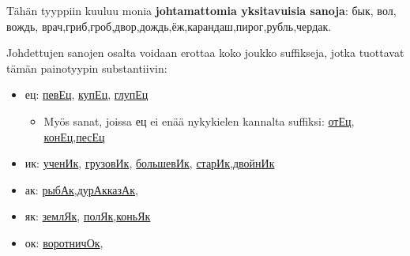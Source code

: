 \documentclass[]{scrreprt}
\providecommand{\tightlist}{%
  \setlength{\itemsep}{0pt}\setlength{\parskip}{0pt}}
\begin{document}
Tähän tyyppiin kuuluu monia \textbf{johtamattomia yksitavuisia sanoja}:
бык, вол, вождь,
врач,гриб,гроб,двор,дождь,ёж,карандаш,пирог,рубль,чердак.

Johdettujen sanojen osalta voidaan erottaa koko joukko suffikseja, jotka
tuottavat tämän painotyypin substantiivin:

\begin{itemize}
\tightlist
\item
  ец:
  \href{http://ru.wiktionary.org/wiki/\%D0\%BF\%D0\%B5\%D0\%B2\%D0\%B5\%D1\%86}{певЕц},
  \href{http://ru.wiktionary.org/wiki/\%D0\%BA\%D1\%83\%D0\%BF\%D0\%B5\%D1\%86}{купЕц},
  \href{http://ru.wiktionary.org/wiki/\%D0\%B3\%D0\%BB\%D1\%83\%D0\%BF\%D0\%B5\%D1\%86}{глупЕц}

  \begin{itemize}
  \tightlist
  \item
    Myös sanat, joissa ец ei enää nykykielen kannalta suffiksi:
    \href{http://ru.wiktionary.org/wiki/\%D0\%BE\%D1\%82\%D0\%B5\%D1\%86}{отЕц},
    \href{http://ru.wiktionary.org/wiki/\%D0\%BA\%D0\%BE\%D0\%BD\%D0\%B5\%D1\%86}{конЕц},\href{http://ru.wiktionary.org/wiki/\%D0\%BF\%D0\%B5\%D1\%81\%D0\%B5\%D1\%86}{песЕц}
  \end{itemize}
\item
  ик:
  \href{http://ru.wiktionary.org/wiki/\%D1\%83\%D1\%87\%D0\%B5\%D0\%BD\%D0\%B8\%D0\%BA}{ученИк},
  \href{http://ru.wiktionary.org/wiki/\%D0\%B3\%D1\%80\%D1\%83\%D0\%B7\%D0\%BE\%D0\%B2\%D0\%B8\%D0\%BA}{грузовИк},
  \href{http://ru.wiktionary.org/wiki/\%D0\%B1\%D0\%BE\%D0\%BB\%D1\%8C\%D1\%88\%D0\%B5\%D0\%B2\%D0\%B8\%D0\%BA}{большевИк},
  \href{http://ru.wiktionary.org/wiki/\%D1\%81\%D1\%82\%D0\%B0\%D1\%80\%D0\%B8\%D0\%BA}{старИк},\href{http://ru.wiktionary.org/wiki/\%D0\%B4\%D0\%B2\%D0\%BE\%D0\%B9\%D0\%BD\%D0\%B8\%D0\%BA}{двойнИк}
\item
  ак:
  \href{http://ru.wiktionary.org/wiki/\%D1\%80\%D1\%8B\%D0\%B1\%D0\%B0\%D0\%BA}{рыбАк},\href{http://ru.wiktionary.org/wiki/\%D0\%B4\%D1\%83\%D1\%80\%D0\%B0\%D0\%BA}{дурАк}\href{http://ru.wiktionary.org/wiki/\%D0\%BA\%D0\%B0\%D0\%B7\%D0\%B0\%D0\%BA}{казАк},
\item
  як:
  \href{http://ru.wiktionary.org/wiki/\%D0\%B7\%D0\%B5\%D0\%BC\%D0\%BB\%D1\%8F\%D0\%BA}{землЯк},
  \href{http://ru.wiktionary.org/wiki/\%D0\%BF\%D0\%BE\%D0\%BB\%D1\%8F\%D0\%BA}{полЯк},\href{http://ru.wiktionary.org/wiki/\%D0\%BA\%D0\%BE\%D0\%BD\%D1\%8C\%D1\%8F\%D0\%BA}{коньЯк}
\item
  ок:
  \href{http://ru.wiktionary.org/wiki/\%D0\%B2\%D0\%BE\%D1\%80\%D0\%BE\%D1\%82\%D0\%BD\%D0\%B8\%D1\%87\%D0\%BE\%D0\%BA}{воротничОк},

\end{itemize}
\end{document}
